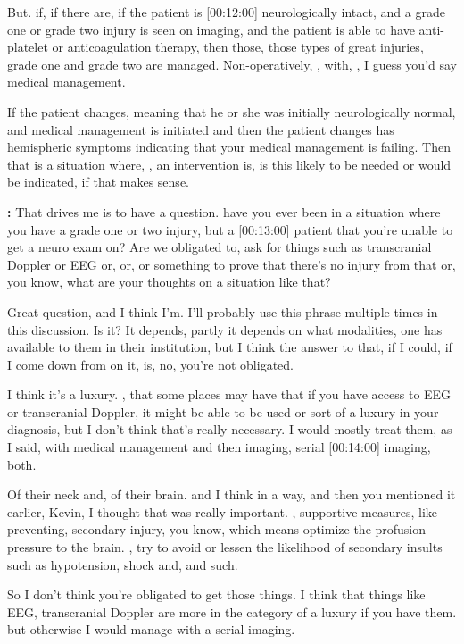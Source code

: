 \documentclass[
]{book}
\begin{document}
But. if, if there are, if the patient is {[}00:12:00{]} neurologically
intact, and a grade one or grade two injury is seen on imaging,
and the patient is able to have anti-platelet or anticoagulation
therapy, then those, those types of great injuries, grade one and grade
two are managed. Non-operatively, , with, , I guess you'd say medical
management.

If the patient changes, meaning that he or she was initially
neurologically normal, and medical management is initiated and then
the patient changes has hemispheric symptoms indicating that your
medical management is failing. Then that is a situation where, , an
intervention is, is this likely to be needed or would be indicated,
if that makes sense.

\textbf{:} That drives me is
to have a question. have you ever been in a situation where you have
a grade one or two injury, but a {[}00:13:00{]} patient that you're unable
to get a neuro exam on? Are we obligated to, ask for things such as
transcranial Doppler or EEG or, or, or something to prove that there's
no injury from that or, you know, what are your thoughts on a situation
like that?

Great
question, and I think I'm. I'll probably use this phrase multiple times
in this discussion. Is it? It depends, partly it depends on what
modalities, one has available to them in their institution, but I think
the answer to that, if I could, if I come down from on it, is, no,
you're not obligated.

I think it's a luxury. , that some places may have that if you have
access to EEG or transcranial Doppler, it might be able to be used or
sort of a luxury in your diagnosis, but I don't think that's really
necessary. I would mostly treat them, as I said, with medical management
and then imaging, serial {[}00:14:00{]} imaging, both.

Of their neck and, of their brain. and I think in a way, and then
you mentioned it earlier, Kevin, I thought that was really important. ,
supportive measures, like preventing, secondary injury, you know, which
means optimize the profusion pressure to the brain. , try to avoid or
lessen the likelihood of secondary insults such as hypotension, shock
and, and such.

So I don't think you're obligated to get those things. I think that
things like EEG, transcranial Doppler are more in the category of a
luxury if you have them. but otherwise I would manage with a serial
imaging.
\end{document}
